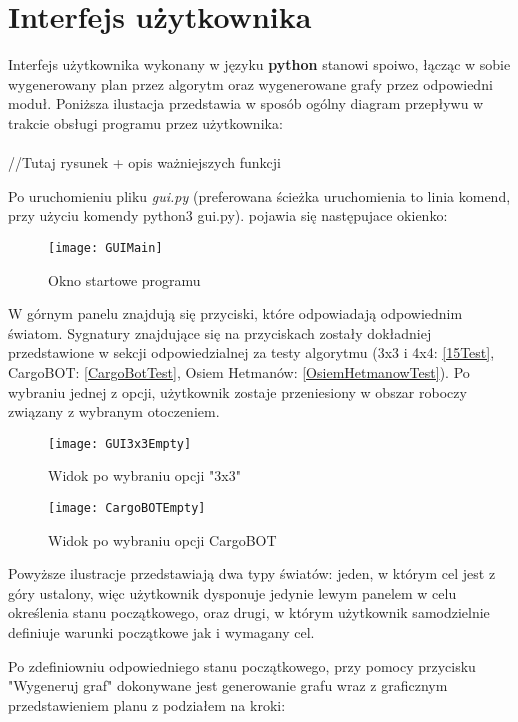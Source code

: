 \section{Interfejs użytkownika}
    \label{GUIRozdzial}
    Interfejs użytkownika wykonany w języku \textbf{python} stanowi spoiwo, łącząc w sobie wygenerowany plan przez algorytm oraz wygenerowane grafy przez 
    odpowiedni moduł. Poniższa ilustacja przedstawia w sposób ogólny diagram przepływu w trakcie obsługi programu przez użytkownika: \\
    \\
    //Tutaj rysunek + opis ważniejszych funkcji

    Po uruchomieniu pliku \textit{gui.py} (preferowana ścieżka uruchomienia to linia komend, przy użyciu komendy python3 gui.py).
    pojawia się następujace okienko:
    \begin{figure}[H]
        \texttt{[image: GUIMain]}
        \centering
        \caption{Okno startowe programu}
    \end{figure}

    W górnym panelu znajdują się przyciski, które odpowiadają odpowiednim światom. Sygnatury znajdujące się na przyciskach zostały 
    dokładniej przedstawione w sekcji odpowiedzialnej za testy algorytmu (3x3 i 4x4: \ref{15Test}, CargoBOT: \ref{CargoBotTest}, 
    Osiem Hetmanów: \ref{OsiemHetmanowTest}). Po wybraniu jednej z opcji, użytkownik zostaje przeniesiony w obszar roboczy związany z wybranym
    otoczeniem.

    \begin{figure}[H]
        \texttt{[image: GUI3x3Empty]}
        \centering
        \caption{Widok po wybraniu opcji "3x3"}
    \end{figure}

    \begin{figure}[H]
        \texttt{[image: CargoBOTEmpty]}
        \centering
        \caption{Widok po wybraniu opcji CargoBOT}
    \end{figure}

    Powyższe ilustracje przedstawiają dwa typy światów: jeden, w którym cel jest z góry ustalony, więc użytkownik dysponuje jedynie lewym panelem w 
    celu określenia stanu początkowego, oraz drugi, w którym użytkownik samodzielnie definiuje warunki początkowe jak i wymagany cel.

    Po zdefiniowniu odpowiedniego stanu początkowego, przy pomocy przycisku "Wygeneruj graf" dokonywane jest generowanie grafu wraz z graficznym 
    przedstawieniem planu z podziałem na kroki:

